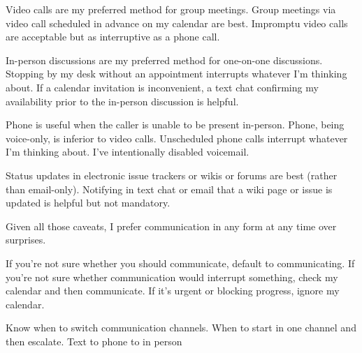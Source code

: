 Video calls are my preferred method for group meetings. Group meetings via video call scheduled in advance on my calendar are best. Impromptu video calls are acceptable but as interruptive as a phone call. 

In-person discussions are my preferred method for one-on-one discussions. Stopping by my desk  without an appointment interrupts whatever I'm thinking about. If a calendar invitation is inconvenient, a text chat confirming my availability prior to the in-person discussion is helpful. 

Phone is useful when the caller is unable to be present in-person. Phone, being voice-only, is inferior to video calls. Unscheduled phone calls interrupt whatever I'm thinking about. I've intentionally disabled voicemail. 

Status updates in electronic issue trackers or wikis or forums are best (rather than email-only). Notifying in text chat or email that a wiki page or issue is updated is helpful but not mandatory. 

Given all those caveats, I prefer communication in any form at any time over surprises. 

If you're not sure whether you should communicate, default to communicating. If you're not sure whether communication would interrupt something, check my calendar and then communicate. If it's urgent or blocking progress, ignore my calendar. 

Know when to switch communication channels.
When to start in one channel and then escalate. Text to phone to in person 
